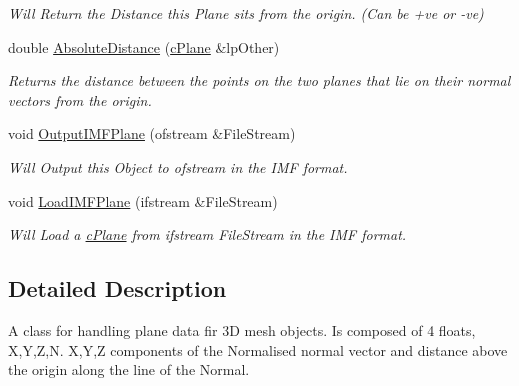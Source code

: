\begin{DoxyCompactItemize}
\begin{DoxyCompactList}\small\item\em Will Return the Distance this Plane sits from the origin. (Can be +ve or -\/ve) \end{DoxyCompactList}\item 
\hypertarget{classc_plane_a041eaa860e54ab87fb06adc08d43fc2d}{
double \hyperlink{classc_plane_a041eaa860e54ab87fb06adc08d43fc2d}{AbsoluteDistance} (\hyperlink{classc_plane}{cPlane} \&lpOther)}
\label{classc_plane_a041eaa860e54ab87fb06adc08d43fc2d}

\begin{DoxyCompactList}\small\item\em Returns the distance between the points on the two planes that lie on their normal vectors from the origin. \end{DoxyCompactList}\item 
\hypertarget{classc_plane_af1f640b742cafe760cb28d8c851b87cf}{
void \hyperlink{classc_plane_af1f640b742cafe760cb28d8c851b87cf}{OutputIMFPlane} (ofstream \&FileStream)}
\label{classc_plane_af1f640b742cafe760cb28d8c851b87cf}

\begin{DoxyCompactList}\small\item\em Will Output this Object to ofstream in the IMF format. \end{DoxyCompactList}\item 
\hypertarget{classc_plane_acca967533621602e8721bc8101a40f0a}{
void \hyperlink{classc_plane_acca967533621602e8721bc8101a40f0a}{LoadIMFPlane} (ifstream \&FileStream)}
\label{classc_plane_acca967533621602e8721bc8101a40f0a}

\begin{DoxyCompactList}\small\item\em Will Load a \hyperlink{classc_plane}{cPlane} from ifstream FileStream in the IMF format. \end{DoxyCompactList}\end{DoxyCompactItemize}


\subsection{Detailed Description}
A class for handling plane data fir 3D mesh objects. Is composed of 4 floats, X,Y,Z,N. X,Y,Z components of the Normalised normal vector and distance above the origin along the line of the Normal. 